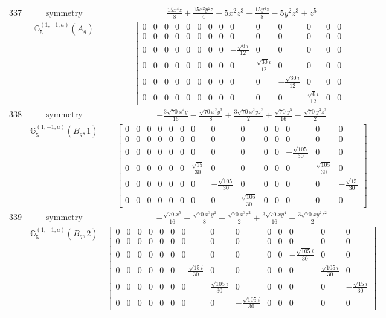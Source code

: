 \documentclass[fleqn,8pt,landscape]{jsarticle}
\begin{document}
\begin{longtable}{ccc}
$ 337 $ & $ \text{symmetry} $ & $ \frac{15 x^{4} z}{8} + \frac{15 x^{2} y^{2} z}{4} - 5 x^{2} z^{3} + \frac{15 y^{4} z}{8} - 5 y^{2} z^{3} + z^{5} $ \\
$  $ & $ \mathbb{G}_{5}^{(1,-1;a)}(A_{g}) $ & $ \begin{bmatrix} 0 & 0 & 0 & 0 & 0 & 0 & 0 & 0 & 0 & 0 & 0 & 0 & 0 & 0 \\ 0 & 0 & 0 & 0 & 0 & 0 & 0 & 0 & 0 & 0 & 0 & 0 & 0 & 0 \\ 0 & 0 & 0 & 0 & 0 & 0 & 0 & 0 & - \frac{\sqrt{6} i}{12} & 0 & 0 & 0 & 0 & 0 \\ 0 & 0 & 0 & 0 & 0 & 0 & 0 & 0 & 0 & \frac{\sqrt{30} i}{12} & 0 & 0 & 0 & 0 \\ 0 & 0 & 0 & 0 & 0 & 0 & 0 & 0 & 0 & 0 & - \frac{\sqrt{30} i}{12} & 0 & 0 & 0 \\ 0 & 0 & 0 & 0 & 0 & 0 & 0 & 0 & 0 & 0 & 0 & \frac{\sqrt{6} i}{12} & 0 & 0 \end{bmatrix} $ \\ \hline
$ 338 $ & $ \text{symmetry} $ & $ - \frac{3 \sqrt{70} x^{4} y}{16} - \frac{\sqrt{70} x^{2} y^{3}}{8} + \frac{3 \sqrt{70} x^{2} y z^{2}}{2} + \frac{\sqrt{70} y^{5}}{16} - \frac{\sqrt{70} y^{3} z^{2}}{2} $ \\
$  $ & $ \mathbb{G}_{5}^{(1,-1;a)}(B_{g},1) $ & $ \begin{bmatrix} 0 & 0 & 0 & 0 & 0 & 0 & 0 & 0 & 0 & 0 & 0 & 0 & 0 & 0 \\ 0 & 0 & 0 & 0 & 0 & 0 & 0 & 0 & 0 & 0 & 0 & 0 & 0 & 0 \\ 0 & 0 & 0 & 0 & 0 & 0 & 0 & 0 & 0 & 0 & 0 & - \frac{\sqrt{105}}{30} & 0 & 0 \\ 0 & 0 & 0 & 0 & 0 & 0 & \frac{\sqrt{15}}{30} & 0 & 0 & 0 & 0 & 0 & \frac{\sqrt{105}}{30} & 0 \\ 0 & 0 & 0 & 0 & 0 & 0 & 0 & - \frac{\sqrt{105}}{30} & 0 & 0 & 0 & 0 & 0 & - \frac{\sqrt{15}}{30} \\ 0 & 0 & 0 & 0 & 0 & 0 & 0 & 0 & \frac{\sqrt{105}}{30} & 0 & 0 & 0 & 0 & 0 \end{bmatrix} $ \\ \hline
$ 339 $ & $ \text{symmetry} $ & $ - \frac{\sqrt{70} x^{5}}{16} + \frac{\sqrt{70} x^{3} y^{2}}{8} + \frac{\sqrt{70} x^{3} z^{2}}{2} + \frac{3 \sqrt{70} x y^{4}}{16} - \frac{3 \sqrt{70} x y^{2} z^{2}}{2} $ \\
$  $ & $ \mathbb{G}_{5}^{(1,-1;a)}(B_{g},2) $ & $ \begin{bmatrix} 0 & 0 & 0 & 0 & 0 & 0 & 0 & 0 & 0 & 0 & 0 & 0 & 0 & 0 \\ 0 & 0 & 0 & 0 & 0 & 0 & 0 & 0 & 0 & 0 & 0 & 0 & 0 & 0 \\ 0 & 0 & 0 & 0 & 0 & 0 & 0 & 0 & 0 & 0 & 0 & - \frac{\sqrt{105} i}{30} & 0 & 0 \\ 0 & 0 & 0 & 0 & 0 & 0 & - \frac{\sqrt{15} i}{30} & 0 & 0 & 0 & 0 & 0 & \frac{\sqrt{105} i}{30} & 0 \\ 0 & 0 & 0 & 0 & 0 & 0 & 0 & \frac{\sqrt{105} i}{30} & 0 & 0 & 0 & 0 & 0 & - \frac{\sqrt{15} i}{30} \\ 0 & 0 & 0 & 0 & 0 & 0 & 0 & 0 & - \frac{\sqrt{105} i}{30} & 0 & 0 & 0 & 0 & 0 \end{bmatrix} $ \\ \hline

\end{longtable}
\end{document}

